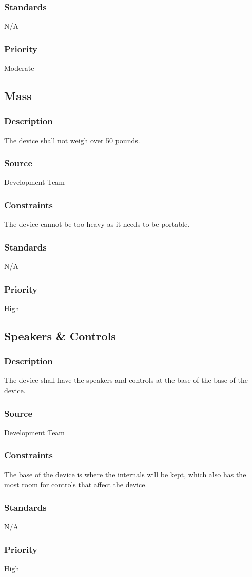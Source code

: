 \subsubsection{Standards}
N/A
\subsubsection{Priority}
Moderate

\subsection{Mass}
\subsubsection{Description}
The device shall not weigh over 50 pounds.
\subsubsection{Source}
Development Team
\subsubsection{Constraints}
The device cannot be too heavy as it needs to be portable.
\subsubsection{Standards}
N/A
\subsubsection{Priority}
High

\subsection{Speakers & Controls}
\subsubsection{Description}
The device shall have the speakers and controls at the base of the base of the device.
\subsubsection{Source}
Development Team
\subsubsection{Constraints}
The base of the device is where the internals will be kept, which also has the most room for controls that affect the device.
\subsubsection{Standards}
N/A
\subsubsection{Priority}
High